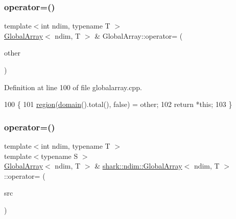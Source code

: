 \hypertarget{classshark_1_1ndim_1_1_global_array_a34d08c80663eaade55f75682e3c12e2f}{}\label{classshark_1_1ndim_1_1_global_array_a34d08c80663eaade55f75682e3c12e2f} 
\subsubsection{\texorpdfstring{operator=()}{operator=()}\hspace{0.1cm}{\footnotesize\ttfamily [2/3]}}
{\footnotesize\ttfamily template$<$int ndim, typename T $>$ \\
\hyperlink{classshark_1_1ndim_1_1_global_array}{Global\+Array}$<$ ndim, T $>$ \& Global\+Array\+::operator= (\begin{DoxyParamCaption}\item[{const \hyperlink{classshark_1_1ndim_1_1_global_array}{Global\+Array}$<$ ndim, T $>$ \&}]{other }\end{DoxyParamCaption})}



Definition at line 100 of file globalarray.\+cpp.


\begin{DoxyCode}
100                                                                                     \{
101     \hyperlink{classshark_1_1ndim_1_1_global_array_a40939e7384b55a49b59c63dc717224d2}{region}(\hyperlink{classshark_1_1ndim_1_1_global_array_a435ee8ff23c3feadf2ef2be64d4f375c}{domain}().total(), \textcolor{keyword}{false}) = other;
102     \textcolor{keywordflow}{return} *\textcolor{keyword}{this};
103 \}
\end{DoxyCode}
\hypertarget{classshark_1_1ndim_1_1_global_array_a4a66a7ee10a7ba6c22690c74824ce73e}{}\label{classshark_1_1ndim_1_1_global_array_a4a66a7ee10a7ba6c22690c74824ce73e} 
\subsubsection{\texorpdfstring{operator=()}{operator=()}\hspace{0.1cm}{\footnotesize\ttfamily [3/3]}}
{\footnotesize\ttfamily template$<$int ndim, typename T $>$ \\
template$<$typename S $>$ \\
\hyperlink{classshark_1_1ndim_1_1_global_array}{Global\+Array}$<$ ndim, T $>$ \& \hyperlink{classshark_1_1ndim_1_1_global_array}{shark\+::ndim\+::\+Global\+Array}$<$ ndim, T $>$\+::operator= (\begin{DoxyParamCaption}\item[{const S \&}]{src }\end{DoxyParamCaption})}



